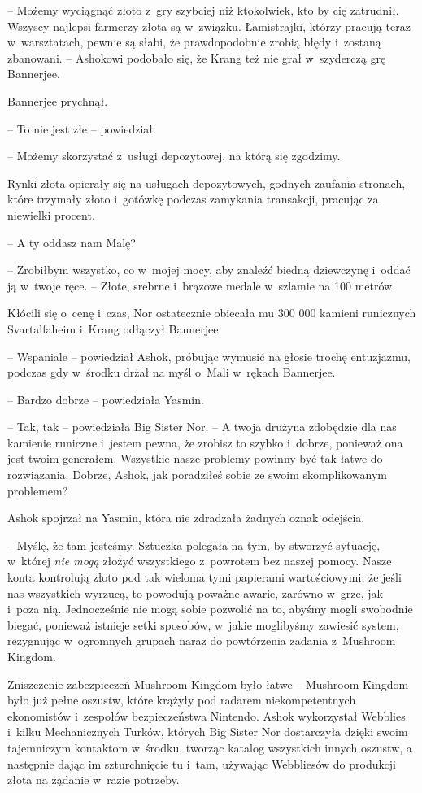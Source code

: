 \documentclass[oneside,polish,11pt,rmheadings]{mwbk}
\begin{document}
-- Możemy wyciągnąć złoto z~gry szybciej niż ktokolwiek, kto by cię zatrudnił. Wszyscy najlepsi farmerzy złota są w~związku. Łamistrajki, którzy pracują teraz w~warsztatach, pewnie są słabi, że prawdopodobnie zrobią błędy i~zostaną zbanowani. -- Ashokowi podobało się, że Krang też nie grał w~szyderczą grę Bannerjee.

Bannerjee prychnął. 

-- To nie jest złe -- powiedział.

-- Możemy skorzystać z~usługi depozytowej, na którą się zgodzimy. 

 Rynki złota opierały się na usługach depozytowych, godnych zaufania stronach, które trzymały złoto i~gotówkę podczas zamykania transakcji, pracując za niewielki procent.

-- A ty oddasz nam Malę?

-- Zrobiłbym wszystko, co w~mojej mocy, aby znaleźć biedną dziewczynę i~oddać ją w~twoje ręce. -- Złote, srebrne i~brązowe medale w~szlamie na 100 metrów.

Kłócili się o~cenę i~czas, Nor ostatecznie obiecała mu 300 000 kamieni runicznych Svartalfaheim i~Krang odłączył Bannerjee.

-- Wspaniale -- powiedział Ashok, próbując wymusić na głosie trochę entuzjazmu, podczas gdy w~środku drżał na myśl o~Mali w~rękach Bannerjee.

-- Bardzo dobrze -- powiedziała Yasmin.

-- Tak, tak -- powiedziała Big Sister Nor. -- A twoja drużyna zdobędzie dla nas kamienie runiczne i~jestem pewna, że zrobisz to szybko i~dobrze, ponieważ ona jest twoim generałem. Wszystkie nasze problemy powinny być tak łatwe do rozwiązania. Dobrze, Ashok, jak poradziłeś sobie ze swoim skomplikowanym problemem? 

Ashok spojrzał na Yasmin, która nie zdradzała żadnych oznak odejścia.

-- Myślę, że tam jesteśmy. Sztuczka polegała na tym, by stworzyć sytuację, w~której \textit{nie mogą }złożyć wszystkiego z~powrotem bez naszej pomocy. Nasze konta kontrolują złoto pod tak wieloma tymi papierami wartościowymi, że jeśli nas wszystkich wyrzucą, to powodują poważne awarie, zarówno w~grze, jak i~poza nią. Jednocześnie nie mogą sobie pozwolić na to, abyśmy mogli swobodnie biegać, ponieważ istnieje setki sposobów, w~jakie moglibyśmy zawiesić system, rezygnując w~ogromnych grupach naraz do powtórzenia zadania z~Mushroom Kingdom.

Zniszczenie zabezpieczeń Mushroom Kingdom było łatwe -- Mushroom Kingdom było już pełne oszustw, które krążyły pod radarem niekompetentnych ekonomistów i~zespołów bezpieczeństwa Nintendo. Ashok wykorzystał Webblies i~kilku Mechanicznych Turków, których Big Sister Nor dostarczyła dzięki swoim tajemniczym kontaktom w~środku, tworząc katalog wszystkich innych oszustw, a następnie dając im szturchnięcie tu i~tam, używając Webbliesów do produkcji złota na żądanie w~razie potrzeby.
\end{document}
